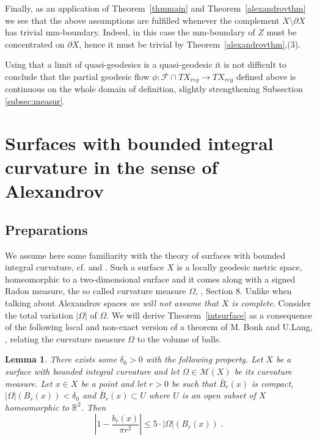 \documentclass[12pt,leqno,intlimits]{amsart}
\numberwithin{equation}{section}
\newtheorem{lem}[thm]{Lemma}
\theoremstyle{definition}
\theoremstyle{remark}
\newcommand{\tref}[1]{Theorem~\ref{#1}}
\newcommand{\R}{\mathbb{R}}
\begin{document}
Finally, as an application of \tref{thmmain} and \tref{alexandrovthm} we see that the above assumptions are fulfilled whenever the complement $X\setminus \partial X$ has trivial mm-boundary. 
Indeed, in this case the mm-boundary of $Z$ must be concentrated on $\partial X$, hence it must be trivial by \tref{alexandrovthm},(3).

Using that a limit of quasi-geodesics is a quasi-geodesic it is not difficult to conclude that the partial geodesic flow $\phi:\mathcal F\cap TX_{reg} \to TX_{reg}$ defined above is continuous on the whole domain of definition, slightly strengthening Subsection \ref{subsec:measur}.



\section{Surfaces with bounded integral curvature in the sense of Alexandrov} \label{sec:surface}
\subsection{Preparations} We assume here some  familiarity  with the theory of surfaces with bounded integral curvature, cf. \cite{AZ} and
 \cite{Reshetnyak-GeomIV}.  Such a surface $X$ is a locally geodesic metric space, homeomorphic to a two-dimensional surface and it comes along with a
signed Radon measure, the so called curvature measure $\Omega$, \cite{Reshetnyak-GeomIV}, Section 8. Unlike when talking about Alexandrov spaces \emph{we will not assume that $X$ is complete}.
 Consider the total variation $|\Omega |$ of $\Omega$.
 We will derive  \tref{intsurface} as a consequence of the following local and non-exact version of a theorem of M. Bonk and U.Lang, \cite{Bonk-Lang}, relating the curvature measure $\Omega$ to the volume of balls.

\begin{lem} \label{lem:bl}
There exists some $\delta _0>0$ with the following property.
Let $X$ be a surface with bounded integral curvature and let  $\Omega\in \mathcal M(X)$ be its   curvature measure. Let $x\in X$ be a point and let $r>0$ be such that
$\bar B_{r} (x)$ is compact,  $| \Omega| ( B_{r} (x) )  < \delta _0$ and $\bar B_{r} (x)\subset U$ where $U$ is an open subset of $X$ homeomorphic to $\R^2$.
Then $$|1- \frac {b_r(x)}  {\pi r^2} | \leq 5 \cdot |\Omega |( B_{r} (x)) \; .$$
\end{lem}
\end{document}
